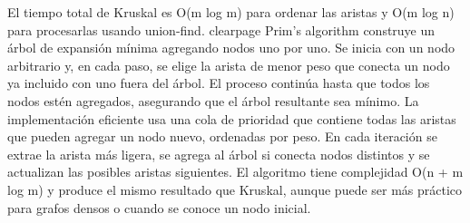 {}El tiempo total de Kruskal es \markdownRendererDollarSign{}O(m \markdownRendererBackslash{}log m)\markdownRendererDollarSign{} para ordenar las aristas y \markdownRendererDollarSign{}O(m \markdownRendererBackslash{}log n)\markdownRendererDollarSign{} para procesarlas usando union-find.\markdownRendererParagraphSeparator
{}\markdownRendererInterblockSeparator
{}\markdownRendererDollarSign{}\markdownRendererBackslash{}clearpage\markdownRendererDollarSign{}\markdownRendererInterblockSeparator
{}
\markdownRendererSectionEnd \markdownRendererSectionBegin
{}\markdownRendererInterblockSeparator
{}Prim’s algorithm construye un árbol de expansión mínima agregando nodos uno por uno.\markdownRendererHardLineBreak
{}Se inicia con un nodo arbitrario y, en cada paso, se elige la arista de menor peso que conecta un nodo ya incluido con uno fuera del árbol.\markdownRendererParagraphSeparator
{}El proceso continúa hasta que todos los nodos estén agregados, asegurando que el árbol resultante sea mínimo.\markdownRendererParagraphSeparator
{}La implementación eficiente usa una cola de prioridad que contiene todas las aristas que pueden agregar un nodo nuevo, ordenadas por peso.\markdownRendererParagraphSeparator
{}En cada iteración se extrae la arista más ligera, se agrega al árbol si conecta nodos distintos y se actualizan las posibles aristas siguientes.\markdownRendererParagraphSeparator
{}El algoritmo tiene complejidad \markdownRendererDollarSign{}O(n + m \markdownRendererBackslash{}log m)\markdownRendererDollarSign{} y produce el mismo resultado que Kruskal, aunque puede ser más práctico para grafos densos o cuando se conoce un nodo inicial.\markdownRendererInterblockSeparator
{}
\markdownRendererSectionEnd 
\markdownRendererSectionEnd 
\markdownRendererSectionEnd \markdownRendererDocumentEnd